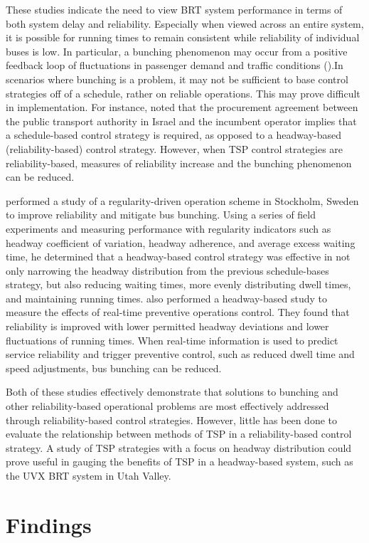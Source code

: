 \documentclass[]{elsarticle} %
\begin{document}
These studies indicate the need to view BRT system performance in terms of both
system delay and reliability. Especially when viewed across an entire system, it
is possible for running times to remain consistent while reliability of
individual buses is low. In particular, a bunching phenomenon may occur from a
positive feedback loop of fluctuations in passenger demand and traffic
conditions (\citet{DELGADO201528}).In scenarios where bunching is a problem, it may not
be sufficient to base control strategies off of a schedule, rather on reliable
operations. This may prove difficult in implementation. For instance,
\citet{ISHAQ2020946} noted that the procurement agreement between the public transport
authority in Israel and the incumbent operator implies that a schedule-based
control strategy is required, as opposed to a headway-based (reliability-based)
control strategy. However, when TSP control strategies are reliability-based,
measures of reliability increase and the bunching phenomenon can be reduced.

\citet{CATS2014223} performed a study of a regularity-driven operation scheme in
Stockholm, Sweden to improve reliability and mitigate bus bunching. Using a
series of field experiments and measuring performance with regularity
indicators such as headway coefficient of variation, headway adherence, and
average excess waiting time, he determined that a headway-based control
strategy was effective in not only narrowing the headway distribution from the
previous schedule-bases strategy, but also reducing waiting times, more evenly
distributing dwell times, and maintaining running times. \citet{CHEN2012} also
performed a headway-based study to measure the effects of real-time preventive
operations control. They found that reliability is improved with lower
permitted headway deviations and lower fluctuations of running times. When
real-time information is used to predict service reliability and trigger
preventive control, such as reduced dwell time and speed adjustments, bus
bunching can be reduced.

Both of these studies effectively demonstrate that solutions to bunching and
other reliability-based operational problems are most effectively addressed
through reliability-based control strategies. However, little has been done to
evaluate the relationship between methods of TSP in a reliability-based control
strategy. A study of TSP strategies with a focus on headway distribution could
prove useful in gauging the benefits of TSP in a headway-based system, such as
the UVX BRT system in Utah Valley.

\hypertarget{findings}{%
\section{Findings}\label{findings}}


\end{document}
